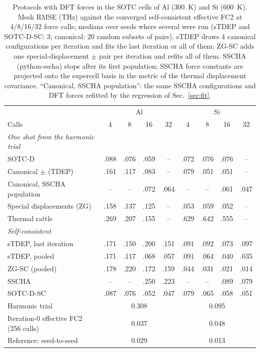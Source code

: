 \begin{table}[t]
\caption{Protocols with DFT forces in the SOTC cells of Al (300~K) and Si (600~K). Mesh RMSE (THz) against the converged self-consistent effective FC2 at 4/8/16/32 force calls; medians over seeds where several were run (sTDEP and SOTC-D-SC: 3; canonical: 20 random subsets of pairs). sTDEP draws 4 canonical configurations per iteration and fits the last iteration or all of them; ZG-SC adds one special-displacement $\pm$ pair per iteration and refits all of them. SSCHA (python-sscha) stops after its first population; SSCHA force constants are projected onto the supercell basis in the metric of the thermal displacement covariance. ``Canonical, SSCHA population'': the same SSCHA configurations and DFT forces refitted by the regression of Sec.~\ref{sec:fit}.}
\label{tab:dft_sc}
\begin{ruledtabular}
\begin{tabular}{lcccccccc}
 & \multicolumn{4}{c}{Al} & \multicolumn{4}{c}{Si}\\
Calls & 4 & 8 & 16 & 32 & 4 & 8 & 16 & 32\\
\hline
\textit{One shot from the harmonic trial} &  &  &  &  &  &  &  & \\
SOTC-D & .088 & .076 & .059 & -- & .072 & .076 & .076 & --\\
Canonical $\pm$ (TDEP) & .161 & .117 & .083 & -- & .079 & .051 & .051 & --\\
Canonical, SSCHA population & -- & -- & .072 & .064 & -- & -- & .061 & .047\\
Special displacements (ZG) & .158 & .137 & .125 & -- & .053 & .059 & .052 & --\\
Thermal rattle & .269 & .207 & .155 & -- & .629 & .642 & .555 & --\\
\textit{Self-consistent} &  &  &  &  &  &  &  & \\
sTDEP, last iteration & .171 & .150 & .200 & .151 & .091 & .092 & .073 & .097\\
sTDEP, pooled & .171 & .117 & .068 & .057 & .091 & .064 & .040 & .035\\
ZG-SC (pooled) & .178 & .220 & .172 & .159 & .044 & .031 & .021 & .014\\
SSCHA & -- & -- & .250 & .223 & -- & -- & .089 & .079\\
SOTC-D-SC & .087 & .076 & .052 & .047 & .079 & .065 & .058 & .051\\
\hline
Harmonic trial & \multicolumn{4}{c}{0.308} & \multicolumn{4}{c}{0.095}\\
Iteration-0 effective FC2 (256 calls) & \multicolumn{4}{c}{0.037} & \multicolumn{4}{c}{0.048}\\
Reference: seed-to-seed & \multicolumn{4}{c}{0.029} & \multicolumn{4}{c}{0.013}\\
\end{tabular}
\end{ruledtabular}
\end{table}
